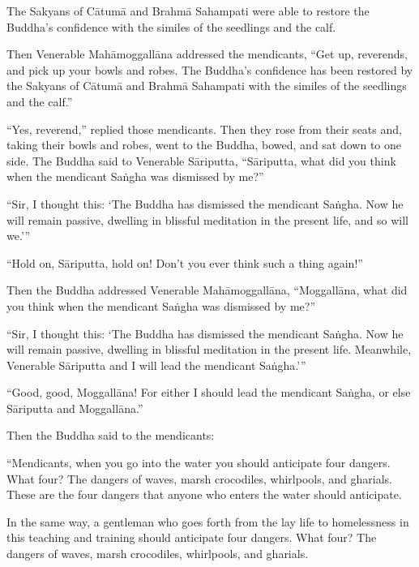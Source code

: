 \documentclass[12pt,openany]{book}%
\begin{document}
The Sakyans of \textsanskrit{Cātumā} and \textsanskrit{Brahmā} Sahampati were able to restore the Buddha’s confidence with the similes of the seedlings and the calf. 

Then Venerable \textsanskrit{Mahāmoggallāna} addressed the mendicants, “Get up, reverends, and pick up your bowls and robes. The Buddha’s confidence has been restored by the Sakyans of \textsanskrit{Cātumā} and \textsanskrit{Brahmā} Sahampati with the similes of the seedlings and the calf.” 

“Yes, reverend,” replied those mendicants. Then they rose from their seats and, taking their bowls and robes, went to the Buddha, bowed, and sat down to one side. The Buddha said to Venerable \textsanskrit{Sāriputta}, “\textsanskrit{Sāriputta}, what did you think when the mendicant \textsanskrit{Saṅgha} was dismissed by me?” 

“Sir, I thought this: ‘The Buddha has dismissed the mendicant \textsanskrit{Saṅgha}. Now he will remain passive, dwelling in blissful meditation in the present life, and so will we.’” 

“Hold on, \textsanskrit{Sāriputta}, hold on! Don’t you ever think such a thing again!” 

Then the Buddha addressed Venerable \textsanskrit{Mahāmoggallāna}, “\textsanskrit{Moggallāna}, what did you think when the mendicant \textsanskrit{Saṅgha} was dismissed by me?” 

“Sir, I thought this: ‘The Buddha has dismissed the mendicant \textsanskrit{Saṅgha}. Now he will remain passive, dwelling in blissful meditation in the present life. Meanwhile, Venerable \textsanskrit{Sāriputta} and I will lead the mendicant \textsanskrit{Saṅgha}.’” 

“Good, good, \textsanskrit{Moggallāna}! For either I should lead the mendicant \textsanskrit{Saṅgha}, or else \textsanskrit{Sāriputta} and \textsanskrit{Moggallāna}.” 

Then the Buddha said to the mendicants: 

“Mendicants, when you go into the water you should anticipate four dangers. What four? The dangers of waves, marsh crocodiles, whirlpools, and gharials. These are the four dangers that anyone who enters the water should anticipate. 

In the same way, a gentleman who goes forth from the lay life to homelessness in this teaching and training should anticipate four dangers. What four? The dangers of waves, marsh crocodiles, whirlpools, and gharials. 
\end{document}
